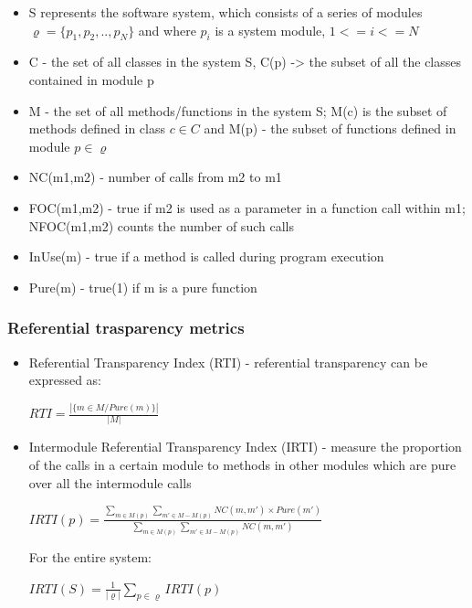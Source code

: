 \documentclass{article}
\begin{document}
\begin{itemize}
\item S represents the software system, which consists of a series of modules $\varrho= \{ p_1,p_2,..,p_N \}$ and where $p_i$ is a system module, $1<=i<=N$
\item C - the set of all classes in the system S, C(p) -> the subset of all the classes contained in module p
\item M - the set of all methods/functions in the system S; M(c) is the subset of methods defined in class $c \in C$ and M(p) - the subset of functions defined in module $p \in \varrho$
\item NC(m1,m2) - number of calls from m2 to m1
\item FOC(m1,m2) - true if m2 is used as a parameter in a function call within m1; NFOC(m1,m2) counts the number of such calls
\item InUse(m) - true if a method is called during program execution 
\item Pure(m) - true(1) if m is a pure function
\end{itemize}

\subsubsection{Referential trasparency metrics}

\begin{itemize}
\item Referential Transparency Index (RTI) - referential transparency can be expressed as:  

\begin{center}
\begin{math}
  RTI = \frac{ | \{ m \in M / Pure(m) \} | } { | M | }
\end{math}
\end{center}

\item Intermodule Referential Transparency Index (IRTI) - measure the proportion of the calls in a certain module to methods in other modules which are pure over all the intermodule calls

\begin{center}
$ IRTI(p) = \frac {\sum_{m \in M(p)} \sum_{m' \in  {M - M(p)}} NC(m,m') \times Pure(m')} {\sum_{m \in M(p)} \sum_{m' \in {M - M(p)}} NC(m,m')} $
\end{center}

For the entire system: 

\begin{center}
$ {IRTI(S) = \frac {1} {|\varrho|} \sum_{p \in \varrho} IRTI(p)} $ 
\end{center}
\end{itemize}
\end{document}
